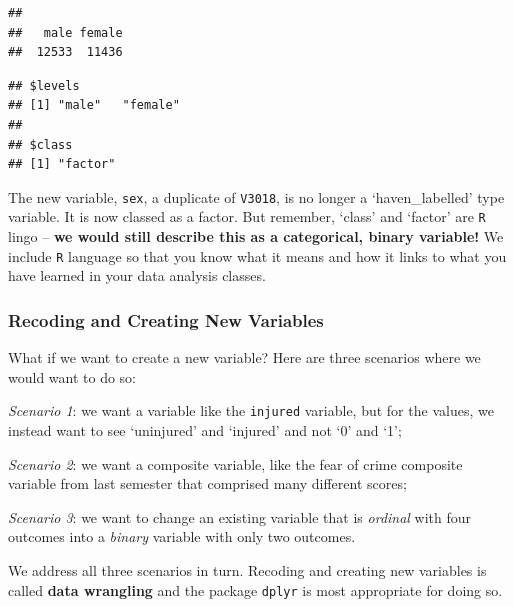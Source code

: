 \documentclass[
]{book}
\newenvironment{Shaded}{\begin{snugshade}}{\end{snugshade}}
\newcommand{\FunctionTok}[1]{\textcolor[rgb]{0.00,0.00,0.00}{#1}}
\newcommand{\NormalTok}[1]{#1}
\newcommand{\SpecialCharTok}[1]{\textcolor[rgb]{0.00,0.00,0.00}{#1}}
\begin{document}
\begin{verbatim}
## 
##   male female 
##  12533  11436
\end{verbatim}

\begin{Shaded}
\end{Shaded}

\begin{verbatim}
## $levels
## [1] "male"   "female"
## 
## $class
## [1] "factor"
\end{verbatim}

The new variable, \texttt{sex}, a duplicate of \texttt{V3018}, is no longer a `haven\_labelled' type variable. It is now classed as a factor. But remember, `class' and `factor' are \texttt{R} lingo -- \textbf{we would still describe this as a categorical, binary variable!} We include \texttt{R} language so that you know what it means and how it links to what you have learned in your data analysis classes.

\hypertarget{recoding-and-creating-new-variables}{%
\subsubsection{Recoding and Creating New Variables}\label{recoding-and-creating-new-variables}}

What if we want to create a new variable? Here are three scenarios where we would want to do so:

\emph{Scenario 1}: we want a variable like the \texttt{injured} variable, but for the values, we instead want to see `uninjured' and `injured' and not `0' and `1';

\emph{Scenario 2}: we want a composite variable, like the fear of crime composite variable from last semester that comprised many different scores;

\emph{Scenario 3}: we want to change an existing variable that is \emph{ordinal} with four outcomes into a \emph{binary} variable with only two outcomes.

We address all three scenarios in turn. Recoding and creating new variables is called \textbf{data wrangling} and the package \texttt{dplyr} is most appropriate for doing so.
\end{document}
